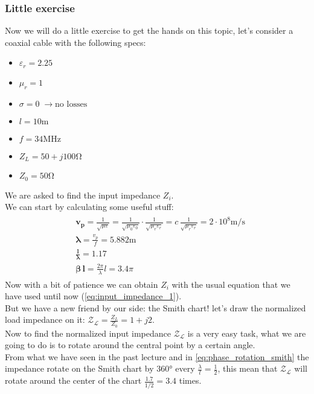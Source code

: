 \subsubsection*{Little exercise}
Now we will do a little exercise to get the hands on this topic, let's consider a coaxial cable with the following specs:
\begin{multicols}{2}
    \begin{itemize}
    \item $\varepsilon_r=2.25$
    \item $\mu_r=1$
    \item $\sigma=0\;\rightarrow \text{no losses}$
    \item $l=10\si{\metre}$
    \item $f=34\si{\mega\hertz}$
    \item $Z_L=50+j100 \si{\ohm}$
    \item $Z_0=50\si{\ohm}$
    \end{itemize}
\end{multicols}
We are asked to find the input impedance $Z_i$.\\
We can start by calculating some useful stuff:
\begin{align*}
    \begin{split}
        &\bm{v_p}=\frac{1}{\sqrt{\mu\varepsilon}}=\frac{1}{\sqrt{\mu_0\varepsilon_0}}\cdot\frac{1}{\sqrt{\mu_r\varepsilon_r}}=c\,\frac{1}{\sqrt{\mu_r\varepsilon_r}}=2\cdot 10^{8}\si{\metre\per\second}\\[5pt]
        &\bm{\lambda}=\frac{v_p}{f}=5.882\si{\metre}\\[5pt]
        &\bm{\frac{l}{\lambda}}=1.17\\[5pt]
        &\bm{\beta\,l}=\frac{2\pi}{\lambda}l=3.4\pi
    \end{split}
\end{align*}
Now with a bit of patience we can obtain $Z_i$ with the usual equation that we have used until now (\cref{eq:input_impedance_1}).\\
But we have a new friend by our side: the Smith chart! let's draw the normalized load impedance on it: $\mathcal{Z_L}=\frac{Z_L}{Z_0}=1+j2 $.\\
Now to find the normalized input impedance $\mathcal{Z_L}$ is a very easy task, what we are going to do is to rotate around the central point by a certain angle.\\
From what we have seen in the past lecture and in \cref{eq:phase_rotation_smith} the impedance rotate on the Smith chart by $360\si{\degree}$ every $\frac{\lambda}{l}=\frac{1}{2}$, this mean that $\mathcal{Z_L}$ will rotate around the center of the chart $\frac{1.7}{1/2}=3.4$ times.\\
